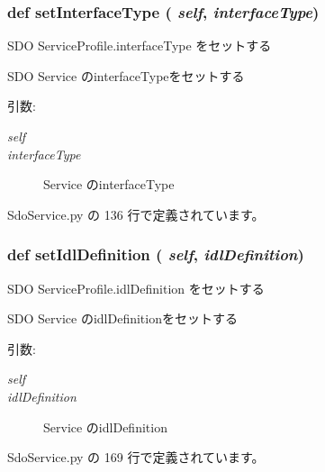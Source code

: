 \subsubsection{\setlength{\rightskip}{0pt plus 5cm}def setInterfaceType ( {\em self},  {\em interfaceType})}\label{classsource__py_1_1_sdo_service_1_1_s_d_o_service_profile_fc937bac70f8820bebc736114407479f}


SDO ServiceProfile.interfaceType をセットする 

SDO Service のinterfaceTypeをセットする

\begin{Desc}
\item[引数:]
\begin{description}
\item[{\em self}]\item[{\em interfaceType}]Service のinterfaceType \end{description}
\end{Desc}


 SdoService.py の 136 行で定義されています。
\subsubsection{\setlength{\rightskip}{0pt plus 5cm}def setIdlDefinition ( {\em self},  {\em idlDefinition})}\label{classsource__py_1_1_sdo_service_1_1_s_d_o_service_profile_afb3467756b498ba3131c9d732a231a1}


SDO ServiceProfile.idlDefinition をセットする 

SDO Service のidlDefinitionをセットする

\begin{Desc}
\item[引数:]
\begin{description}
\item[{\em self}]\item[{\em idlDefinition}]Service のidlDefinition \end{description}
\end{Desc}


 SdoService.py の 169 行で定義されています。
